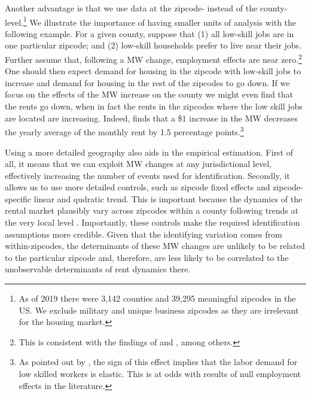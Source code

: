 Another advantage is that we use data at the zipcode- instead of the county-level.\footnote{
	As of 2019 there were 3,142 counties and 39,295 meaningful zipcodes in the US. We exclude 
	military and unique business zipcodes as they are irrelevant for the housing market.} 
We illustrate the importance of having smaller units of analysis with the following example. 
For a given county, suppose that (1) all low-skill jobs are in one particular zipcode; and 
(2) low-skill households prefer to live near their jobs. Further assume that, following a MW 
change, employment effects are near zero.\footnote{This is consistent with the findings of 
	\textcite{CardKrueger2000} and \textcite{CegnizEtAl2019}, among others.} 
One should then expect demand for housing in the zipcode with low-skill jobs to increase and 
demand for housing in the rest of the zipcodes to go down. If we focus on the effects of the 
MW increase on the county we might even find that the rents go down, when in fact the rents in 
the zipcodes where the low skill jobs are located are increasing. Indeed, \textcite{Tidemann2018} 
finds that a \$1 increase in the MW decreases the yearly average of the monthly rent by 1.5 
percentage points.\footnote{As pointed out by \textcite{Tidemann2018}, the sign of this 
	effect 	implies that the labor demand for low skilled workers is elastic. This is at 
	odds with results of null employment effects in the literature.} 

Using a more detailed geography also aids in the empirical estimation. First of all, it means 
that we can exploit MW changes at any jurisdictional level, effectively increasing the number 
of events used for identification. Secondly, it allows us to use more detailed controls, such 
as zipcode fixed effects and zipcode-specific linear and qudratic trend. This is important 
because the dynamics of the rental market plausibly vary across zipcodes within a county 
following trends at the very local level \parencite{AlmagroDominguez2019}. Importantly, these 
controls make the required identification assumptions more credible. Given that the identifying 
variation comes from within-zipcodes, the determinants of these MW changes are unlikely to be 
related to the particular zipcode and, therefore, are less likely to be correlated to the 
unobservable determinants of rent dynamics there.


